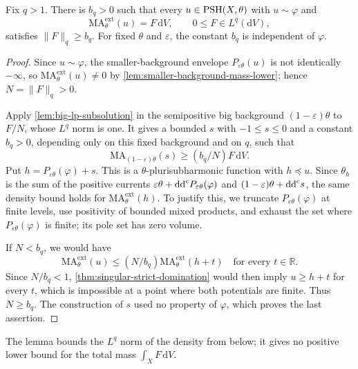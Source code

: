 \begin{lemma}\label{lem:relative-density-lower-bound}
Fix $q>1$. There is $b_q>0$ such that every $u\in\mathrm{PSH}(X,\theta)$ with $u\sim\varphi$ and
\[
 \mathrm{MA}^{\mathrm{ext}}_\theta(u)=F\,\mathrm{d}V,
 \qquad 0\leq F\in L^q(\mathrm{d}V),
\]
satisfies $\|F\|_q\geq b_q$. For fixed $\theta$ and $\varepsilon$, the constant $b_q$ is independent of $\varphi$.
\end{lemma}
\begin{proof}
Since $u\sim\varphi$, the smaller-background envelope $P_{\varepsilon\theta}(u)$ is not identically $-\infty$, so $\mathrm{MA}^{\mathrm{ext}}_\theta(u)\neq0$ by \cref{lem:smaller-background-mass-lower}; hence $N=\|F\|_q>0$.

Apply \cref{lem:big-lp-subsolution} in the semipositive big background $(1-\varepsilon)\theta$ to $F/N$, whose $L^q$ norm is one. It gives a bounded $s$ with $-1\leq s\leq0$ and a constant $b_q>0$, depending only on this fixed background and on $q$, such that
\[
 \mathrm{MA}_{(1-\varepsilon)\theta}(s)\geq(b_q/N)F\,\mathrm{d}V.
\]
Put $h=P_{\varepsilon\theta}(\varphi)+s$. This is a $\theta$-plurisubharmonic function with $h\preceq u$. Since $\theta_h$ is the sum of the positive currents $\varepsilon\theta+\mathrm{dd}^{\mathrm{c}} P_{\varepsilon\theta}(\varphi)$ and $(1-\varepsilon)\theta+\mathrm{dd}^{\mathrm{c}} s$, the same density bound holds for $\mathrm{MA}^{\mathrm{ext}}_\theta(h)$. To justify this, we truncate $P_{\varepsilon\theta}(\varphi)$ at finite levels, use positivity of bounded mixed products, and exhaust the set where $P_{\varepsilon\theta}(\varphi)$ is finite; its pole set has zero volume.

If $N<b_q$, we would have
\[
 \mathrm{MA}^{\mathrm{ext}}_\theta(u)
       \leq(N/b_q)\mathrm{MA}^{\mathrm{ext}}_\theta(h+t)
 \quad\text{for every }t\in\mathbb R.
\]
Since $N/b_q<1$, \cref{thm:singular-strict-domination} would then imply $u\geq h+t$ for every $t$, which is impossible at a point where both potentials are finite. Thus $N\geq b_q$. The construction of $s$ used no property of $\varphi$, which proves the last assertion.
\end{proof}

The lemma bounds the $L^q$ norm of the density from below; it gives no positive lower bound for the total mass $\int_XF\,\mathrm{d}V$.
